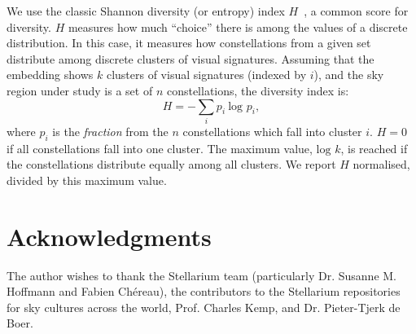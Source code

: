 \documentclass[10pt]{article}
\begin{document}
We use the classic Shannon diversity (or entropy) index $H$~\cite{shannon1948mathematical}, a common score for diversity. $H$ measures how much ``choice'' there is among the values of a discrete distribution. In this case, it measures how constellations from a given set distribute among discrete clusters of visual signatures. Assuming that the embedding shows $k$ clusters of visual signatures (indexed by $i$), and the sky region under study is a set of $n$ constellations, the diversity index is:
\[
H = - \sum_i p_i\ \text{log } p_i,
\]
where $p_i$ is the \emph{fraction} from the $n$ constellations which fall into cluster $i$. $H=0$ if all constellations fall into one cluster. The maximum value, $\text{log } k$, is reached if the constellations distribute equally among all clusters. We report $H$ normalised, divided by this maximum value. 


\section*{Acknowledgments}

The author wishes to thank the Stellarium team (particularly Dr. Susanne M. Hoffmann and Fabien Ch{\'e}reau), the contributors to the Stellarium repositories for sky cultures across the world, Prof. Charles Kemp, and Dr. Pieter-Tjerk de Boer.

\end{document}
